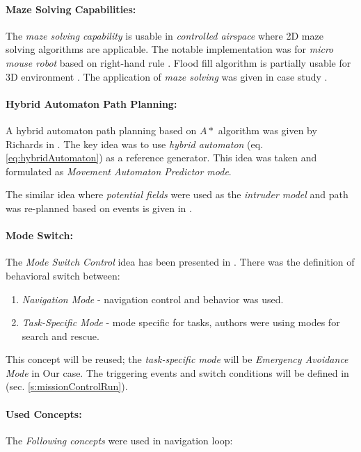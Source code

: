 \paragraph{Maze Solving Capabilities:} The \emph{maze solving capability} is usable in \emph{controlled airspace} where 2D maze solving algorithms are applicable. The notable implementation was for \emph{micro mouse robot} based on right-hand rule \cite{mishra2008maze}. Flood fill algorithm is partially usable for 3D environment \cite{elshamarka2012design}. The application of \emph{maze solving} was given in case study \cite{chatelais2014maze}.

\paragraph{Hybrid Automaton Path Planning:} A hybrid automaton path planning based on $A*$ algorithm was given by Richards in \cite{richards2004hybrid}. The key idea was to use \emph{hybrid automaton} (eq. \ref{eq:hybridAutomaton}) as a reference generator. This idea was taken and formulated as \emph{Movement Automaton Predictor mode}. 

The similar idea where \emph{potential fields} were used as the  \emph{intruder model} and path was re-planned  based on events is given in \cite{dong2011hybrid}.

\paragraph{Mode Switch:} The \emph{Mode Switch Control} idea has been presented in \cite{ryan2005mode}. There was the definition of behavioral switch between:

\begin{enumerate}
    \item \emph{Navigation Mode} - navigation control and behavior was used.
    
    \item \emph{Task-Specific Mode} - mode specific for tasks, authors were using modes for search and rescue. 
\end{enumerate}

This concept will be reused; the \emph{task-specific mode} will be \emph{Emergency Avoidance Mode} in Our case. The triggering events and switch conditions will be defined in (sec. \ref{s:missionControlRun}).

\paragraph{Used Concepts:} The \emph{Following concepts} were used in navigation loop:

